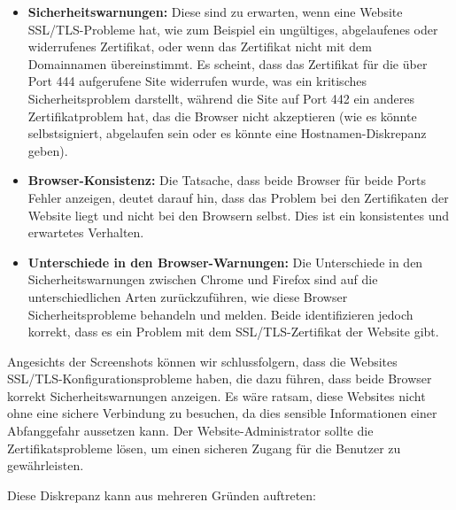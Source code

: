 \documentclass{article}
\begin{document}
\begin{itemize}
    \item \textbf{Sicherheitswarnungen:} Diese sind zu erwarten, wenn eine Website SSL/TLS-Probleme hat, wie zum Beispiel ein ungültiges, abgelaufenes oder widerrufenes Zertifikat, oder wenn das Zertifikat nicht mit dem Domainnamen übereinstimmt. Es scheint, dass das Zertifikat für die über Port 444 aufgerufene Site widerrufen wurde, was ein kritisches Sicherheitsproblem darstellt, während die Site auf Port 442 ein anderes Zertifikatproblem hat, das die Browser nicht akzeptieren (wie es könnte selbstsigniert, abgelaufen sein oder es könnte eine Hostnamen-Diskrepanz geben).

    \item \textbf{Browser-Konsistenz:} Die Tatsache, dass beide Browser für beide Ports Fehler anzeigen, deutet darauf hin, dass das Problem bei den Zertifikaten der Website liegt und nicht bei den Browsern selbst. Dies ist ein konsistentes und erwartetes Verhalten.

    \item \textbf{Unterschiede in den Browser-Warnungen:} Die Unterschiede in den Sicherheitswarnungen zwischen Chrome und Firefox sind auf die unterschiedlichen Arten zurückzuführen, wie diese Browser Sicherheitsprobleme behandeln und melden. Beide identifizieren jedoch korrekt, dass es ein Problem mit dem SSL/TLS-Zertifikat der Website gibt.
\end{itemize}

Angesichts der Screenshots können wir schlussfolgern, dass die Websites SSL/TLS-Konfigurationsprobleme haben, die dazu führen, dass beide Browser korrekt Sicherheitswarnungen anzeigen. Es wäre ratsam, diese Websites nicht ohne eine sichere Verbindung zu besuchen, da dies sensible Informationen einer Abfanggefahr aussetzen kann. Der Website-Administrator sollte die Zertifikatsprobleme lösen, um einen sicheren Zugang für die Benutzer zu gewährleisten.


Diese Diskrepanz kann aus mehreren Gründen auftreten:
\end{document}
